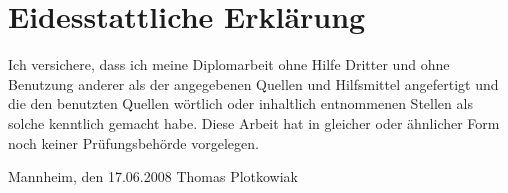 \chapter*{Eidesstattliche Erkl\"{a}rung}\thispagestyle{empty}Ich versichere, dass ich meine Diplomarbeit ohne Hilfe Dritter und ohne Benutzung anderer als der angegebenen Quellen und Hilfsmittel angefertigt und die den benutzten Quellen w\"{o}rtlich oder inhaltlich entnommenen Stellen als solche kenntlich gemacht habe. Diese Arbeit hat in gleicher oder \"{a}hnlicher Form noch keiner Pr\"{u}fungsbeh\"{o}rde vorgelegen.

\bigskip \raggedright{Mannheim, den 17.06.2008} \bigskip \bigskip \bigskip Thomas Plotkowiak